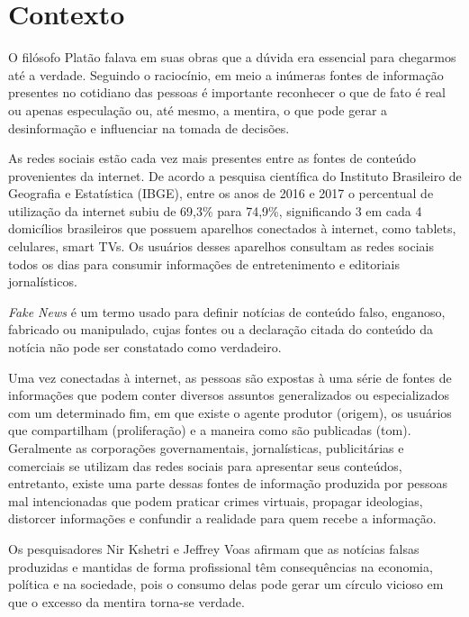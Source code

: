 \chapter {Contexto}

O filósofo Platão\cite{Platao} falava em suas obras que a dúvida era essencial para chegarmos até a verdade. Seguindo o raciocínio, em meio a inúmeras fontes de informação presentes no cotidiano das pessoas é importante reconhecer o que de fato é real ou apenas especulação ou, até mesmo, a mentira, o que pode gerar a desinformação e influenciar na tomada de decisões.

As redes sociais estão cada vez mais presentes entre as fontes de conteúdo provenientes da internet\cite{Livro-Fake-News}. De acordo a pesquisa científica do Instituto Brasileiro de Geografia e Estatística (IBGE)\cite{IBGE-internet}, entre os anos de 2016 e 2017 o percentual de utilização da internet subiu de 69,3\% para 74,9\%, significando 3 em cada 4 domicílios brasileiros que possuem aparelhos conectados à internet, como tablets, celulares, smart TVs. Os usuários desses aparelhos consultam as redes sociais todos os dias para consumir informações de entretenimento e editoriais jornalísticos\cite{Livro-Fake-News}.

\textit{Fake News} é um termo usado para definir notícias
de conteúdo falso, enganoso, fabricado ou manipulado, cujas
fontes ou a declaração citada do conteúdo da notícia não pode
ser constatado como verdadeiro\cite{Uso-abuso-midia-fake-news}.

Uma vez conectadas à internet, as pessoas são expostas à uma série de fontes de informações que podem conter diversos assuntos generalizados ou especializados com um determinado fim, em que existe o agente produtor (origem), os usuários que compartilham (proliferação) e a maneira como são publicadas (tom)\cite{origem-proliferacao-fake}. Geralmente as corporações governamentais, jornalísticas, publicitárias e comerciais se utilizam das redes sociais para apresentar seus conteúdos, entretanto, existe uma parte dessas fontes de informação produzida por pessoas mal intencionadas que podem praticar crimes virtuais, propagar ideologias, distorcer informações e confundir a realidade para quem recebe a informação\cite{Economia-do-fake-news}.

Os pesquisadores Nir Kshetri e Jeffrey Voas\cite{Economia-do-fake-news} afirmam que as notícias falsas produzidas e mantidas de forma profissional têm consequências na economia, política e na sociedade, pois o consumo delas pode gerar um círculo vicioso em que o excesso da mentira torna-se verdade.

